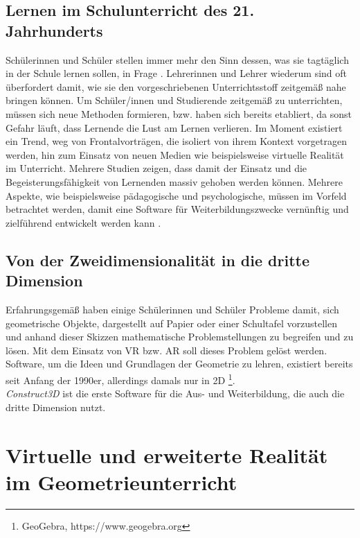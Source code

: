 \documentclass[deutsch]{llncs}
\begin{document}
\subsection{Lernen im Schulunterricht des 21. Jahrhunderts}
Schülerinnen und Schüler stellen immer mehr den Sinn dessen, was sie tagtäglich in der Schule lernen sollen, in Frage \cite{Klampfer}. Lehrerinnen und Lehrer wiederum sind oft überfordert damit, wie sie den vorgeschriebenen Unterrichtsstoff zeitgemäß nahe bringen können. Um Schüler/innen und Studierende zeitgemäß zu unterrichten, müssen sich neue Methoden formieren, bzw. haben sich bereits etabliert, da sonst Gefahr läuft, dass Lernende die Lust am Lernen verlieren. Im Moment existiert ein Trend, weg von Frontalvorträgen, die isoliert von ihrem Kontext vorgetragen werden, hin zum Einsatz von neuen Medien wie beispielsweise virtuelle Realität im Unterricht. Mehrere Studien \cite{Hu-Au} zeigen, dass damit der Einsatz und die Begeisterungsfähigkeit von Lernenden massiv gehoben werden können.
Mehrere Aspekte, wie beispielsweise pädagogische und psychologische, müssen im Vorfeld betrachtet werden, damit eine Software für Weiterbildungszwecke vernünftig und zielführend entwickelt werden kann \cite{article}.
\subsection{Von der Zweidimensionalität in die dritte Dimension}
Erfahrungsgemäß haben einige Schülerinnen und Schüler Probleme damit, sich geometrische Objekte, dargestellt auf Papier oder einer Schultafel vorzustellen und anhand dieser Skizzen mathematische Problemstellungen zu begreifen und zu lösen. Mit dem Einsatz von VR bzw. AR soll dieses Problem gelöst werden.\\
Software, um die Ideen und Grundlagen der Geometrie zu lehren, existiert bereits seit Anfang der 1990er, allerdings damals nur in 2D \footnote{GeoGebra, https://www.geogebra.org}. \\
\emph{Construct3D} ist die erste Software für die Aus- und Weiterbildung, die auch die dritte Dimension nutzt. %
\section{Virtuelle und erweiterte Realität im Geometrieunterricht}
\end{document}
